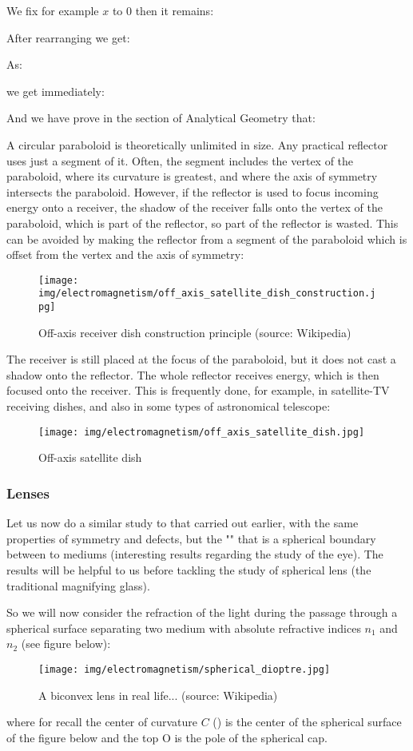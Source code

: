 	We fix for example $x$ to $0$ then it remains:
	
	After rearranging we get:
	
	As:
	
	we get immediately:
	
	And we have prove in the section of Analytical Geometry that:
	
	A circular paraboloid is theoretically unlimited in size. Any practical reflector uses just a segment of it. Often, the segment includes the vertex of the paraboloid, where its curvature is greatest, and where the axis of symmetry intersects the paraboloid. However, if the reflector is used to focus incoming energy onto a receiver, the shadow of the receiver falls onto the vertex of the paraboloid, which is part of the reflector, so part of the reflector is wasted. This can be avoided by making the reflector from a segment of the paraboloid which is offset from the vertex and the axis of symmetry:
	\begin{figure}[H]
		\centering
		\texttt{[image: img/electromagnetism/off\_axis\_satellite\_dish\_construction.jpg]}	
		\caption[Off-axis receiver dish construction principle]{Off-axis receiver dish construction principle (source: Wikipedia)}
	\end{figure}
	The receiver is still placed at the focus of the paraboloid, but it does not cast a shadow onto the reflector. The whole reflector receives energy, which is then focused onto the receiver. This is frequently done, for example, in satellite-TV receiving dishes, and also in some types of astronomical telescope:
	\begin{figure}[H]
		\centering
		\texttt{[image: img/electromagnetism/off\_axis\_satellite\_dish.jpg]}	
		\caption{Off-axis satellite dish}
	\end{figure}
	
	\pagebreak
	\subsubsection{Lenses}
	Let us now do a similar study to that carried out earlier, with the same properties of symmetry and defects, but the "" that is a spherical boundary between to mediums (interesting results regarding the study of the eye). The results will be helpful to us before tackling the study of spherical lens (the traditional magnifying glass).
	
	So we will now consider the refraction of the light during the passage through a spherical surface separating two medium with absolute refractive indices $n_1$ and $n_2$ (see figure below):
	\begin{figure}[H]
		\centering
		\texttt{[image: img/electromagnetism/spherical\_dioptre.jpg]}
		\caption[A biconvex lens in real life]{A biconvex lens in real life... (source: Wikipedia)}
	\end{figure}
	where for recall the center of curvature $C$ () is the center of the spherical surface of the figure below and the top O is the pole of the spherical cap.

